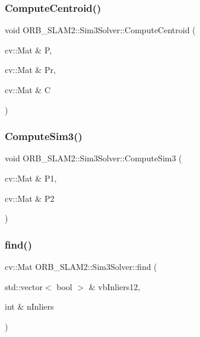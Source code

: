 \subsubsection{\texorpdfstring{Compute\+Centroid()}{ComputeCentroid()}}
{\footnotesize\ttfamily void O\+R\+B\+\_\+\+S\+L\+A\+M2\+::\+Sim3\+Solver\+::\+Compute\+Centroid (\begin{DoxyParamCaption}\item[{cv\+::\+Mat \&}]{P,  }\item[{cv\+::\+Mat \&}]{Pr,  }\item[{cv\+::\+Mat \&}]{C }\end{DoxyParamCaption})\hspace{0.3cm}{\ttfamily [protected]}}

\mbox{\label{class_o_r_b___s_l_a_m2_1_1_sim3_solver_a87ee2729feee5729397c650b26927a8f}} 
\subsubsection{\texorpdfstring{Compute\+Sim3()}{ComputeSim3()}}
{\footnotesize\ttfamily void O\+R\+B\+\_\+\+S\+L\+A\+M2\+::\+Sim3\+Solver\+::\+Compute\+Sim3 (\begin{DoxyParamCaption}\item[{cv\+::\+Mat \&}]{P1,  }\item[{cv\+::\+Mat \&}]{P2 }\end{DoxyParamCaption})\hspace{0.3cm}{\ttfamily [protected]}}

\mbox{\label{class_o_r_b___s_l_a_m2_1_1_sim3_solver_a34ba62d5d8033ab12a811c241f30544b}} 
\subsubsection{\texorpdfstring{find()}{find()}}
{\footnotesize\ttfamily cv\+::\+Mat O\+R\+B\+\_\+\+S\+L\+A\+M2\+::\+Sim3\+Solver\+::find (\begin{DoxyParamCaption}\item[{std\+::vector$<$ bool $>$ \&}]{vb\+Inliers12,  }\item[{int \&}]{n\+Inliers }\end{DoxyParamCaption})}

